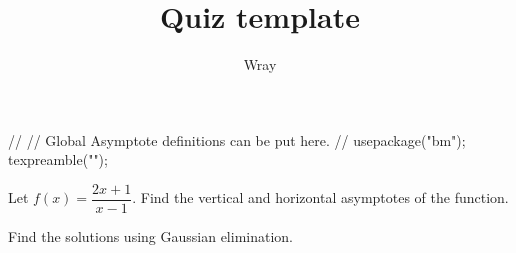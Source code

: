 \documentclass[addpoints, 12pt]{exam}
\title{Quiz template}
\author{Wray}
\begin{document}
\begin{asydef}
//
// Global Asymptote definitions can be put here.
//
usepackage("bm");
texpreamble("\def\V#1{\bm{#1}}");
\end{asydef}



\bigskip

             
\bigskip
\bigskip

\smallskip

\begin{questions}

\question[10]
Let $f(x) = \dfrac{2x+1}{x-1}$.  Find the vertical and horizontal asymptotes of the function.

\newpage

\question[10]
Find the solutions using Gaussian elimination.

\end{questions}
\end{document}
